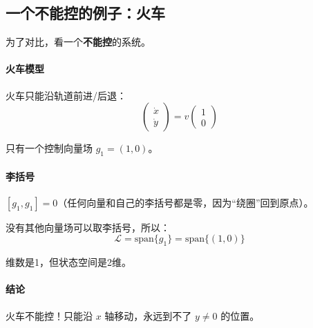 \subsection*{一个不能控的例子：火车}

为了对比，看一个\textbf{不能控}的系统。

\paragraph{火车模型}

火车只能沿轨道前进/后退：
\begin{equation}
\begin{pmatrix} \dot{x} \\ \dot{y} \end{pmatrix} = v \begin{pmatrix} 1 \\ 0 \end{pmatrix}
\end{equation}

只有一个控制向量场 $g_1 = (1, 0)$。

\paragraph{李括号}

$[g_1, g_1] = 0$（任何向量和自己的李括号都是零，因为“绕圈”回到原点）。

没有其他向量场可以取李括号，所以：
\begin{equation}
\mathcal{L} = \text{span}\{g_1\} = \text{span}\{(1, 0)\}
\end{equation}

维数是1，但状态空间是2维。

\paragraph{结论}

火车不能控！只能沿 $x$ 轴移动，永远到不了 $y \neq 0$ 的位置。

